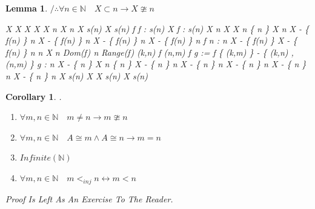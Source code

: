 \documentclass[10pt,a4paper]{book}
\newtheorem{lemma}{Lemma}[section]
\newtheorem{corollary}{Corollary}[section]
\begin{document}
\begin{lemma} $ / \therefore \forall  n \in \mathbb{N} \quad  X \subset n \to X \ncong n   $

    \begin{fitchproof}[arrayenv=tabular]

         { \forall X \quad X  \to X   }          
        \open
         { \forall X \quad X \subset n \to X \ncong n }
        \open
         {  X \subset s(n) }
        \open
         {  X \cong s(n) }
         {  \exists f \quad f : s(n)    X  }
        \open
         {  f : s(n)    X  }
        \open
         {  n \notin  X  }
         {   X \subset n \cup \{ n \} }
         {  X \subseteq n }
         {  X - \{ f(n) \} \subset n }
         { X - \{ f(n) \} \subset n \to X - \{ f(n) \} \ncong n }
         {  X - \{ f(n) \} \ncong n }
         {   f \upharpoonright n : n    X - \{ f(n) \} }
         {  X - \{ f(n) \} \cong n }
         {   \bot }
        \close
        \open
         {  n \in  X  }
         {  n \in  Dom(f)  }
         {  n \in  Range(f)  }
        \open
         {  (k,n) \in  f  }
         {  (n,m) \in  f  }
         {  g := f \cup \{ (k,m) \} - \{ (k,n) , (n,m) \}  }
         {  g : n    X - \{ n \}  }
         {   X \subset n \cup \{ n \} }
         {   X - \{ n \} \subset n  }
         {   X - \{ n \} \subset n \to  X - \{ n \} \ncong n  }
         {   X - \{ n \} \ncong n  }
         {   X - \{ n \} \cong n  }
         {  \bot  }
        \close
        \close
        \close
         {  \bot  }
        \close
         {  X \ncong s(n) }
        \close
         { \forall X \quad  X \subset s(n) \to X \ncong s(n) }
        \close

    \end{fitchproof}

\end{lemma}

\begin{corollary}.\\
    \begin{enumerate}
        \setlength{\itemsep}{0pt} %
        \item       $\forall m,n \in \mathbb{N} \quad m \not= n \to m \ncong n$
        \item       $\forall m,n \in \mathbb{N} \quad A \cong m \land A \cong n \to  m = n   $
        \item       $ Infinite(\mathbb{N})  $
        \item       $\forall m,n \in \mathbb{N} \quad m <_{inj} n \leftrightarrow m < n$
    \end{enumerate}
    Proof Is Left As An Exercise To The Reader.
\end{corollary}
\end{document}
